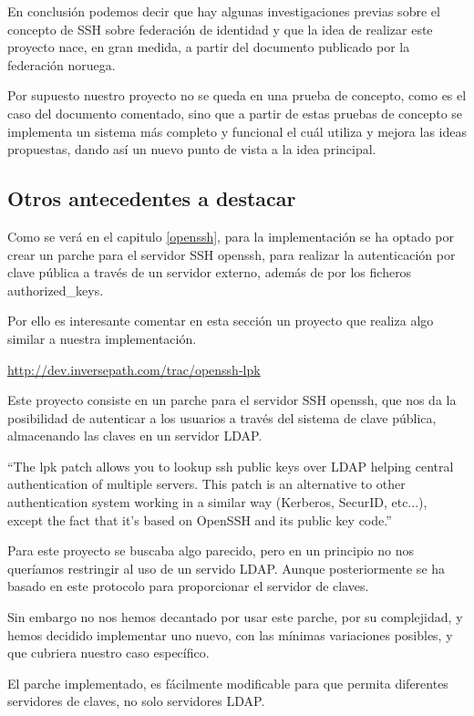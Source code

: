     En conclusión podemos decir que hay algunas investigaciones
    previas sobre el concepto de SSH sobre federación de identidad y
    que la idea de realizar este proyecto nace, en gran medida, a
    partir del documento publicado por la federación noruega.
    
    Por supuesto nuestro proyecto no se queda en una prueba de
    concepto, como es el caso del documento comentado, sino que a
    partir de estas pruebas de concepto se implementa un sistema
    más completo y funcional el cuál utiliza y mejora las ideas
    propuestas, dando así un nuevo punto de vista a la idea principal.
    
    \subsection{Otros antecedentes a destacar}
    
        Como se verá en el capitulo \ref{openssh}, para la
        implementación se ha optado por crear un parche para el
        servidor SSH openssh, para realizar la autenticación por clave
        pública a través de un servidor externo, además de por los
        ficheros authorized\_keys.

        Por ello es interesante comentar en esta sección un proyecto
        que realiza algo similar a nuestra implementación.

        \href{http://dev.inversepath.com/trac/openssh-lpk}{http://dev.inversepath.com/trac/openssh-lpk}
        \cite{lpk}

        Este proyecto consiste en un parche para el servidor SSH
        openssh, que nos da la posibilidad de autenticar a los
        usuarios a través del sistema de clave pública, almacenando
        las claves en un servidor LDAP.

        ``The lpk patch allows you to lookup ssh public keys over LDAP
        helping central authentication of multiple servers. This patch
        is an alternative to other authentication system working in a
        similar way (Kerberos, SecurID, etc...), except the fact that
        it's based on OpenSSH and its public key code.''
        
        Para este proyecto se buscaba algo parecido, pero en un
        principio no nos queríamos restringir al uso de un servido
        LDAP. Aunque posteriormente se ha basado en este protocolo
        para proporcionar el servidor de claves.

        Sin embargo no nos hemos decantado por usar este parche, por
        su complejidad, y hemos decidido implementar uno nuevo, con
        las mínimas variaciones posibles, y que cubriera nuestro caso
        específico.

        El parche implementado, es fácilmente modificable para que
        permita diferentes servidores de claves, no solo servidores
        LDAP.
